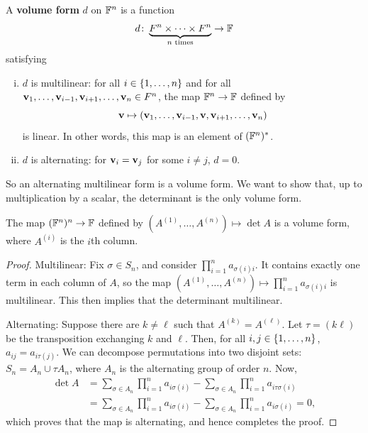 \documentclass[a4paper,11pt]{article}
\begin{document}
\begin{definition}
	A \textbf{volume form} $ d $ on $ {\mathbb{F}}^n $ is a function 
	\[
		d \colon \underbrace{F^n \times \dots \times F^n}_{n \text{ times}} \to {\mathbb{F}}
	\]
	satisfying
	\begin{enumerate}[(i)]
		\item $ d $ is multilinear: for all $ i \in \qty{1, \dots, n} $ and for all $ {\bf v}_1, \dots, {\bf v}_{i-1}, {\bf v}_{i+1}, \dots, {\bf v}_n \in F^n $, the map $ {\mathbb{F}}^n \to {\mathbb{F}} $ defined by
		      \[
			      {\bf v} \mapsto ({\bf v}_1, \dots, {\bf v}_{i-1}, {\bf v}, {\bf v}_{i+1}, \dots, {\bf v}_n)
		      \]
		      is linear.
		      In other words, this map is an element of $ ({\mathbb{F}}^n)^* $.
		\item $ d $ is alternating: for $ {\bf v}_i = {\bf v}_j $ for some $ i \neq j $, $ d = 0 $.
	\end{enumerate}
\end{definition}

So an alternating multilinear form is a volume form.
We want to show that, up to multiplication by a scalar, the determinant is the only volume form.

\begin{lemma}
	The map $ ({\mathbb{F}}^n)^n \to {\mathbb{F}} $ defined by $ (A^{(1)}, \dots, A^{(n)}) \mapsto \det A $ is a volume form, where $ A^{(i)} $ is the $i$th column.
\end{lemma}
\begin{proof}
	Multilinear: 
	Fix $ \sigma \in S_n $, and consider $ \prod_{i=1}^n a_{\sigma(i) i} $.
	It contains exactly one term in each column of $ A $,
	so the map $ (A^{(1)}, \dots, A^{(n)}) \mapsto \prod_{i=1}^n a_{\sigma(i) i} $ is multilinear.
	This then implies that the determinant multilinear.

	Alternating:
	Suppose there are $k\neq \ell$ such that $ A^{(k)} = A^{(\ell)} $. 
	Let $ \tau = ( k \ell ) $ be the transposition exchanging $ k $ and $ \ell $.
	Then, for all $ i, j \in \qty{1, \dots, n} $, $ a_{ij} = a_{i \tau(j)} $.
	We can decompose permutations into two disjoint sets: $ S_n = A_n \cup \tau A_n $, where $ A_n $ is the alternating group of order $ n $.
	Now, 
	\begin{align*}
		\det A &= \sum_{\sigma\in A_n} \prod_{i=1}^{n} a_{i \sigma(i)} - \sum_{\sigma\in A_n} \prod_{i=1}^{n} a_{i \tau\sigma(i)}\\ 
		&= \sum_{\sigma\in A_n} \prod_{i=1}^{n} a_{i \sigma(i)} - \sum_{\sigma\in A_n} \prod_{i=1}^{n} a_{i \sigma(i)} = 0,
	\end{align*}
	which proves that the map is alternating, and hence completes the proof. 
\end{proof}
\end{document}
